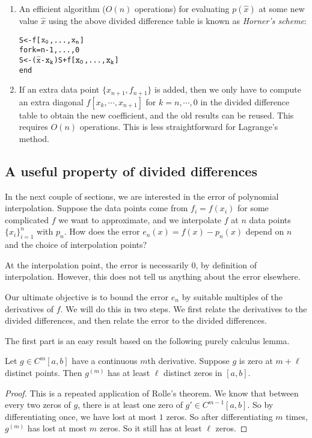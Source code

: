\documentclass[a4paper]{article}
\begin{document}
\begin{enumerate}
  \item An efficient algorithm ($O(n)$ operations) for evaluating $p(\hat{x})$ at some new value $\hat{x}$ using the above divided difference table is known as \emph{Horner's scheme}:
    \begin{alltt}
      S <- f[\(\mathtt{x\sb{0}}\),..., \(\mathtt{x\sb{n}}\)]
      for k = n - 1,..., 0
          S <- (\(\mathtt{\hat{x}}\) - \(\mathtt{x\sb{k}}\))S + f[\(\mathtt{x\sb{0}}\),..., \(\mathtt{x\sb{k}}\)]
      end\end{alltt}
  \item If an extra data point $\{x_{n + 1}, f_{n + 1}\}$ is added, then we only have to compute an extra diagonal $f[x_k, \cdots, x_{n + 1}]$ for $k =n, \cdots, 0$ in the divided difference table to obtain the new coefficient, and the old results can be reused. This requires $O(n)$ operations. This is less straightforward for Lagrange's method.
\end{enumerate}

\subsection{A useful property of divided differences}
In the next couple of sections, we are interested in the error of polynomial interpolation. Suppose the data points come from $f_i = f(x_i)$ for some complicated $f$ we want to approximate, and we interpolate $f$ at $n$ data points $\{x_i\}_{i = 1}^n$ with $p_n$. How does the error $e_n(x) = f(x) - p_n(x)$ depend on $n$ and the choice of interpolation points?

At the interpolation point, the error is necessarily $0$, by definition of interpolation. However, this does not tell us anything about the error elsewhere.

Our ultimate objective is to bound the error $e_n$ by suitable multiples of the derivatives of $f$. We will do this in two steps. We first relate the derivatives to the divided differences, and then relate the error to the divided differences.

The first part is an easy result based on the following purely calculus lemma.
\begin{lemma}
  Let $g \in C^m[a, b]$ have a continuous $m$th derivative. Suppose $g$ is zero at $m + \ell$ distinct points. Then $g^{(m)}$ has at least $\ell$ distinct zeros in $[a, b]$.
\end{lemma}

\begin{proof}
  This is a repeated application of Rolle's theorem. We know that between every two zeros of $g$, there is at least one zero of $g' \in C^{m - 1}[a, b]$. So by differentiating once, we have lost at most $1$ zeros. So after differentiating $m$ times, $g^{(m)}$ has lost at most $m$ zeros. So it still has at least $\ell$ zeros.
\end{proof}
\end{document}

